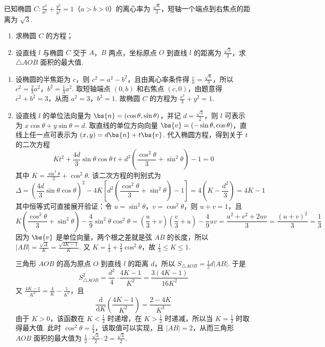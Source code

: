 \begin{problem}
已知椭圆 \(C: \frac{x^2}{a^2} + \frac{y^2}{b^2} = 1\)（\(a > b > 0\)）的离心率为 \(\frac{\sqrt{6}}{3}\)，短轴一个端点到右焦点的距离为 \(\sqrt{3}\).

\begin{enumerate}
\item 求椭圆 \(C\) 的方程；
\item 设直线 \(l\) 与椭圆 \(C\) 交于 \(A\)，\(B\) 两点，坐标原点 \(O\) 到直线 \(l\) 的距离为 \(\frac{\sqrt{3}}{2}\)，求 \(\triangle AOB\) 面积的最大值.
\end{enumerate}
\end{problem}

\begin{solution}
\begin{enumerate}
\item 设椭圆的半焦距为 \(c\)，则 \(c^2=a^2-b^2\)，且由离心率条件得 \(\frac{c}{a}=\frac{\sqrt{6}}{3}\)，所以 \(c^2=\frac23a^2\)，\(b^2=\frac13a^2\). 取短轴端点 \(\left(0,b\right)\) 和右焦点 \(\left(c,0\right)\)，由题意得 \(c^2+b^2=3\)，从而 \(a^2=3\)，\(b^2=1\). 故椭圆 \(C\) 的方程为 \(\frac{x^2}{3}+y^2=1\).
\item 设直线 \(l\) 的单位法向量为 \(\bs{n}=\left(\cos\theta,\sin\theta\right)\)，并记 \(d=\frac{\sqrt3}{2}\)，则 \(l\) 可表示为 \(x\cos\theta+y\sin\theta=d\). 取直线的单位方向向量 \(\bs{v}=\left(-\sin\theta,\cos\theta\right)\)，直线上任一点可表示为 \(\left(x,y\right)=d\bs{n}+t\bs{v}\). 代入椭圆方程，得到关于 \(t\) 的二次方程
\[
K t^2+\frac{4d}{3}\sin\theta\cos\theta\,t+d^2\left(\frac{\cos^2\theta}{3}+\sin^2\theta\right)-1=0
\]
其中 \(K=\frac{\sin^2\theta}{3}+\cos^2\theta\). 该二次方程的判别式为
\[
\Delta=\left(\frac{4d}{3}\sin\theta\cos\theta\right)^2-4K\left[d^2\left(\frac{\cos^2\theta}{3}+\sin^2\theta\right)-1\right]=4\left(K-\frac{d^2}{3}\right)=4K-1
\]
其中恒等式可直接展开验证：令 \(u=\sin^2\theta\)，\(v=\cos^2\theta\)，则 \(u+v=1\)，且
\[
K\left(\frac{\cos^2\theta}{3}+\sin^2\theta\right)-\frac49\sin^2\theta\cos^2\theta
=\left(\frac{u}{3}+v\right)\left(\frac{v}{3}+u\right)-\frac49uv
=\frac{u^2+v^2+2uv}{3}=\frac{(u+v)^2}{3}=\frac13
\]
因为 \(\bs{v}\) 是单位向量，两个根之差就是弦 \(AB\) 的长度，所以 \(|AB|=\frac{\sqrt{\Delta}}{K}=\frac{\sqrt{4K-1}}{K}\). 又 \(K=\frac13+\frac23\cos^2\theta\)，故 \(\frac13\leqslant K\leqslant1\).

三角形 \(AOB\) 的高为原点 \(O\) 到直线 \(l\) 的距离 \(d\)，所以 \(S_{\triangle AOB}=\frac12d|AB|\). 于是
\[
S_{\triangle AOB}^2=\frac{d^2}{4}\cdot\frac{4K-1}{K^2}=\frac{3\left(4K-1\right)}{16K^2}
\]
又 \(\frac{4K-1}{K^2}=\frac4K-\frac1{K^2}\)，且
\[
\frac{\mathrm d}{\mathrm dK}\left(\frac{4K-1}{K^2}\right)=\frac{2-4K}{K^3}
\]
由于 \(K>0\)，该函数在 \(K<\frac12\) 时递增，在 \(K>\frac12\) 时递减，所以当 \(K=\frac12\) 时取得最大值. 此时 \(\cos^2\theta=\frac14\)，该取值可以实现，且 \(|AB|=2\)，从而三角形 \(AOB\) 面积的最大值为 \(\frac12\cdot\frac{\sqrt3}{2}\cdot2=\frac{\sqrt3}{2}\).
\end{enumerate}
\end{solution}

